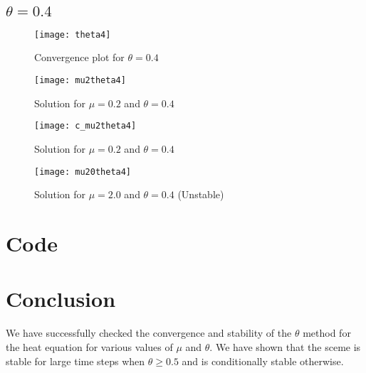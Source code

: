 \documentclass{article}
\begin{document}
\clearpage
\subsection{$\theta = 0.4$}
\begin{figure}[h!]
    \centering
    \texttt{[image: theta4]}
    \caption{Convergence plot for $\theta=0.4$}
\end{figure}

\begin{figure}[h!]
    \centering
    \texttt{[image: mu2theta4]}
    \caption{Solution for $\mu=0.2$ and $\theta=0.4$}
\end{figure}
\begin{figure}[h!]
    \centering
    \texttt{[image: c\_mu2theta4]}
    \caption{Solution for $\mu=0.2$ and $\theta=0.4$}
\end{figure}
\begin{figure}[h!]
    \centering
    \texttt{[image: mu20theta4]}
    \caption{Solution for $\mu=2.0$ and $\theta=0.4$ (Unstable)}
\end{figure}
\clearpage
\section{Code}


\section{Conclusion}
We have successfully checked the convergence and stability of the $\theta$ method for the heat equation for various values of $\mu$ and $\theta$. We have shown that the sceme is stable for large time steps when $\theta \geq 0.5$ and is conditionally stable otherwise.
\end{document}
